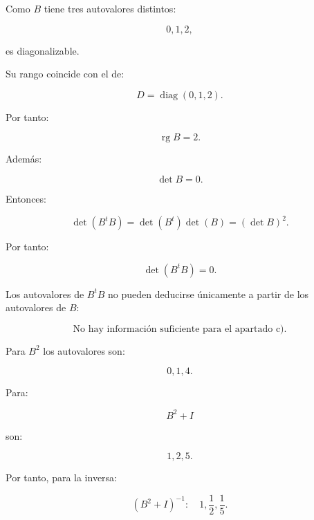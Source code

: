 \documentclass[11pt,a4paper]{article}
\newcommand{\rg}{\operatorname{rg}}
\newcommand{\diag}{\operatorname{diag}}
\begin{document}
Como $B$ tiene tres autovalores distintos:

\[
0,1,2,
\]

es diagonalizable.

Su rango coincide con el de:

\[
D=\diag(0,1,2).
\]

Por tanto:

\[
\boxed{
\rg B=2.
}
\]

Además:

\[
\det B=0.
\]

Entonces:

\[
\det(B^tB)
=
\det(B^t)\det(B)
=
(\det B)^2.
\]

Por tanto:

\[
\boxed{
\det(B^tB)=0.
}
\]

Los autovalores de $B^tB$ no pueden deducirse únicamente a partir de los autovalores de $B$:

\[
\boxed{
\text{No hay información suficiente para el apartado c).}
}
\]

Para $B^2$ los autovalores son:

\[
0,1,4.
\]

Para:

\[
B^2+I
\]

son:

\[
1,2,5.
\]

Por tanto, para la inversa:

\[
\boxed{
(B^2+I)^{-1}:
\quad
1,\frac12,\frac15.
}
\]
\end{document}
